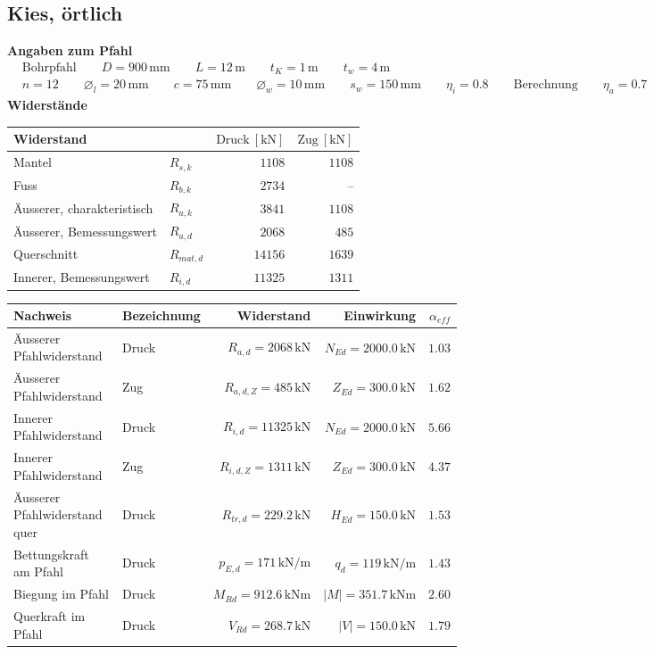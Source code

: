 \documentclass[11pt,a4paper]{article}
\begin{document}
\subsection{Kies, örtlich}
\noindent\textbf{Angaben zum Pfahl}
\begin{equation*}
\begin{aligned} & \text{Bohrpfahl} \qquad D = 900\,\mathrm{mm} \qquad L = 12\,\mathrm{m} \qquad t_K = 1\,\mathrm{m} \qquad t_w = 4\,\mathrm{m} \\ & n = 12 \qquad \varnothing_l = 20\,\mathrm{mm} \qquad c = 75\,\mathrm{mm} \qquad \varnothing_w = 10\,\mathrm{mm} \qquad s_w = 150\,\mathrm{mm} \qquad \eta_i = 0.8 \qquad \text{Berechnung} \qquad \eta_a = 0.7 \end{aligned}
\end{equation*}
\noindent\textbf{Widerstände}
\begin{longtable}{llrr}
\hline
Widerstand &  & $\text{Druck}\ [\mathrm{kN}]$ & $\text{Zug}\ [\mathrm{kN}]$ \\
\hline
\endhead
Mantel & $R_{s,k}$ & $1108$ & $1108$ \\
Fuss & $R_{b,k}$ & $2734$ & – \\
Äusserer, charakteristisch & $R_{a,k}$ & $3841$ & $1108$ \\
Äusserer, Bemessungswert & $R_{a,d}$ & $2068$ & $485$ \\
Querschnitt & $R_{mat,d}$ & $14156$ & $1639$ \\
Innerer, Bemessungswert & $R_{i,d}$ & $11325$ & $1311$ \\
\hline
\end{longtable}
\begin{xltabular}{\linewidth}{>{\raggedright\arraybackslash}X>{\raggedright\arraybackslash}Xrrr}
\hline
Nachweis & Bezeichnung & Widerstand & Einwirkung & $\alpha_{eff}$ \\
\hline
\endhead
Äusserer Pfahlwiderstand & Druck & $R_{a,d} = 2068\,\mathrm{kN}$ & $N_{Ed} = 2000.0\,\mathrm{kN}$ & $1.03$ \\
Äusserer Pfahlwiderstand & Zug & $R_{a,d,Z} = 485\,\mathrm{kN}$ & $Z_{Ed} = 300.0\,\mathrm{kN}$ & $1.62$ \\
Innerer Pfahlwiderstand & Druck & $R_{i,d} = 11325\,\mathrm{kN}$ & $N_{Ed} = 2000.0\,\mathrm{kN}$ & $5.66$ \\
Innerer Pfahlwiderstand & Zug & $R_{i,d,Z} = 1311\,\mathrm{kN}$ & $Z_{Ed} = 300.0\,\mathrm{kN}$ & $4.37$ \\
Äusserer Pfahlwiderstand quer & Druck & $R_{tr,d} = 229.2\,\mathrm{kN}$ & $H_{Ed} = 150.0\,\mathrm{kN}$ & $1.53$ \\
Bettungskraft am Pfahl & Druck & $p_{E,d} = 171\,\mathrm{kN}/\mathrm{m}$ & $q_d = 119\,\mathrm{kN}/\mathrm{m}$ & $1.43$ \\
Biegung im Pfahl & Druck & $M_{Rd} = 912.6\,\mathrm{kNm}$ & $\left|M\right| = 351.7\,\mathrm{kNm}$ & $2.60$ \\
Querkraft im Pfahl & Druck & $V_{Rd} = 268.7\,\mathrm{kN}$ & $\left|V\right| = 150.0\,\mathrm{kN}$ & $1.79$ \\
\hline
\end{xltabular}
\end{document}
